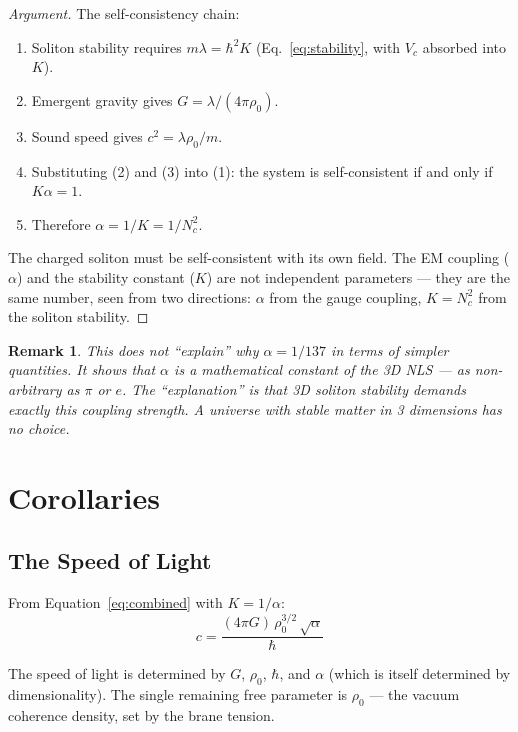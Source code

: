 \documentclass[11pt, a4paper]{article}
\newtheorem{remark}{Remark}[section]
\begin{document}
\begin{proof}[Argument]
The self-consistency chain:
\begin{enumerate}[nosep]
  \item Soliton stability requires $m\lambda = \hbar^2 K$
        (Eq.~\ref{eq:stability}, with $V_c$ absorbed into $K$).
  \item Emergent gravity gives $G = \lambda/(4\pi\rho_0)$.
  \item Sound speed gives $c^2 = \lambda\rho_0/m$.
  \item Substituting (2) and (3) into (1): the system is
        self-consistent if and only if $K\alpha = 1$.
  \item Therefore $\alpha = 1/K = 1/N_c^2$.
\end{enumerate}
The charged soliton must be self-consistent with its own field.
The EM coupling ($\alpha$) and the stability constant ($K$) are
not independent parameters --- they are the same number, seen
from two directions: $\alpha$ from the gauge coupling,
$K = N_c^2$ from the soliton stability.
\end{proof}

\begin{remark}
This does not ``explain'' why $\alpha = 1/137$ in terms of
simpler quantities. It shows that $\alpha$ is a mathematical
constant of the 3D NLS --- as non-arbitrary as $\pi$ or $e$.
The ``explanation'' is that 3D soliton stability demands
exactly this coupling strength. A universe with stable matter
in 3 dimensions has no choice.
\end{remark}

\section{Corollaries}

\subsection{The Speed of Light}

From Equation~\ref{eq:combined} with $K = 1/\alpha$:
\begin{equation}
  \boxed{c = \frac{(4\pi G)\,\rho_0^{3/2}\,\sqrt{\alpha}}{\hbar}}
  \label{eq:c}
\end{equation}

The speed of light is determined by $G$, $\rho_0$, $\hbar$, and
$\alpha$ (which is itself determined by dimensionality). The
single remaining free parameter is $\rho_0$ --- the vacuum
coherence density, set by the brane tension.
\end{document}
